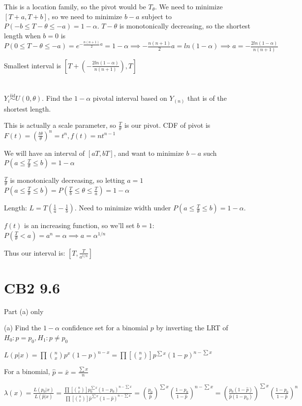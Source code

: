 \documentclass{article}
\let\Oldsum=\sum
\let\Oldprod=\prod
\renewcommand{\sum}{\Oldsum\limits}
\renewcommand{\prod}{\Oldprod\limits}
\newcommand{\iiddist}{\overset{\mathrm{iid}}{\sim}}
\begin{document}
This is a location family, so the pivot would be $T_\theta$. We need to minimize $[T+a, T+b]$, so we need to minimize $b-a$ subject to $P(-b \le T-\theta \le -a) = 1-\alpha$. $T-\theta$ is monotonically decreasing, so the shortest length when $b=0$ is $P(0 \le T-\theta \le -a) = e^{-\frac{n(n+1)}{2}a} = 1-\alpha \implies -\frac{n(n+1)}{2}a = ln(1-\alpha) \implies a = -\frac{2ln(1-\alpha)}{n(n+1)}$

Smallest interval is $[T+(-\frac{2ln(1-\alpha)}{n(n+1)}), T]$

\section{}

$Y_i \iiddist U(0, \theta)$. Find the $1-\alpha$ pivotal interval based on $Y_{(n)}$ that is of the shortest length.

This is actually a scale parameter, so $\frac{T}{\theta}$ is our pivot. CDF of pivot is $F(t) = (\frac{t\theta}{\theta})^n = t^n, f(t) = n t^{n-1}$

We will have an interval of $[aT, bT]$, and want to minimize $b-a$ such $P(a \le \frac{T}{\theta} \le b) = 1-\alpha$

$\frac{T}{\theta}$ is monotonically decreasing, so letting $a = 1$ $P( a \le \frac{T}{\theta} \le b) = P(\frac{T}{b} \le \theta \le \frac{T}{a}) = 1-\alpha$

Length: $L = T(\frac{1}{a} - \frac{1}{b})$. Need to minimize width under $P(a \le \frac{T}{\theta} \le b) = 1-\alpha$.

$f(t)$ is an increasing function, so we'll set $b=1$: $P(\frac{T}{\theta} < a) = a^n = \alpha \implies a = \alpha^{1/n}$

Thus our interval is: $[T, \frac{T}{a^{1/n}}]$

\section{CB2 9.6}

Part (a) only

(a) Find the $1-\alpha$ confidence set for a binomial $p$ by inverting the LRT of $H_0: p = p_0, H_1: p \neq p_0$

$L(p|x) = \prod \binom{n}{x} p^x (1-p)^{n-x} = \prod [\binom{n}{x}] p^{\sum x} (1-p)^{n - \sum x}$

For a binomial, $\hat{p} = \bar{x} = \frac{\sum x}{n}$

$\lambda(x) = \frac{L(p_0|x)}{L(\hat{p}|x)} = \frac{\prod [\binom{n}{x}] p_0^{\sum x} (1-p_0)^{n - \sum x}}{\prod [\binom{n}{x}] \hat{p}^{\sum x} (1-\hat{p})^{n - \sum x}} = (\frac{p_0}{\hat{p}})^{\sum x} (\frac{1-p_0}{1-\hat{p}})^{n-\sum x} = (\frac{p_0(1-\hat{p})}{\hat{p}(1-p_0)})^{\sum x}(\frac{1-p_0}{1-\hat{p}})^n$
\end{document}
